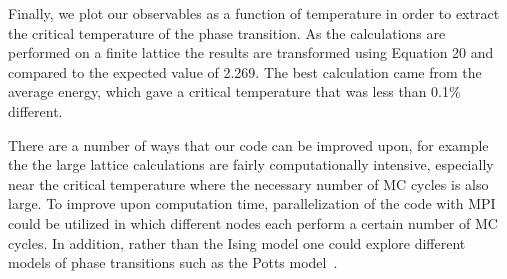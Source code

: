 \documentclass[prc,amsmath,twocolumn,superscriptaddress]{revtex4}
\begin{document}
Finally, we plot our observables as a function of temperature in order to extract the critical temperature of the phase transition. As the calculations are performed on a finite lattice the results are transformed using Equation 20 and compared to the expected value of 2.269. The best calculation came from the average energy, which gave a critical temperature that was less than 0.1\% different.




There are a number of ways that our code can be improved upon, for example the the large lattice calculations are fairly computationally intensive, especially near the critical temperature where the necessary number of MC cycles is also large. To improve upon computation time, parallelization of the code with MPI could be utilized in which different nodes each perform a certain number of MC cycles. In addition, rather than the Ising model one could explore different models of phase transitions such as the Potts model~\cite{potts}.

\end{document}
